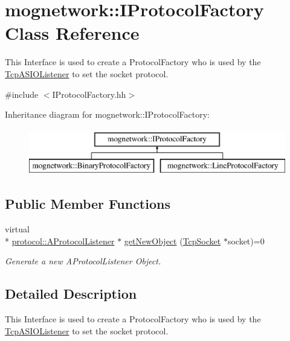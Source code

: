 \hypertarget{classmognetwork_1_1_i_protocol_factory}{\section{mognetwork\-:\-:I\-Protocol\-Factory Class Reference}
\label{classmognetwork_1_1_i_protocol_factory}
}


This Interface is used to create a Protocol\-Factory who is used by the \hyperlink{classmognetwork_1_1_tcp_a_s_i_o_listener}{Tcp\-A\-S\-I\-O\-Listener} to set the socket protocol.  




{\ttfamily \#include $<$I\-Protocol\-Factory.\-hh$>$}

Inheritance diagram for mognetwork\-:\-:I\-Protocol\-Factory\-:\begin{figure}[H]
\begin{center}
\leavevmode
\includegraphics[height=2.000000cm]{classmognetwork_1_1_i_protocol_factory}
\end{center}
\end{figure}
\subsection*{Public Member Functions}
\begin{DoxyCompactItemize}
\item 
virtual \\*
\hyperlink{classmognetwork_1_1protocol_1_1_a_protocol_listener}{protocol\-::\-A\-Protocol\-Listener} $\ast$ \hyperlink{classmognetwork_1_1_i_protocol_factory_a9ed1ba40ab28b76a1285985b1d3662d6}{get\-New\-Object} (\hyperlink{classmognetwork_1_1_tcp_socket}{Tcp\-Socket} $\ast$socket)=0
\begin{DoxyCompactList}\small\item\em Generate a new A\-Protocol\-Listener Object. \end{DoxyCompactList}\end{DoxyCompactItemize}


\subsection{Detailed Description}
This Interface is used to create a Protocol\-Factory who is used by the \hyperlink{classmognetwork_1_1_tcp_a_s_i_o_listener}{Tcp\-A\-S\-I\-O\-Listener} to set the socket protocol. 

